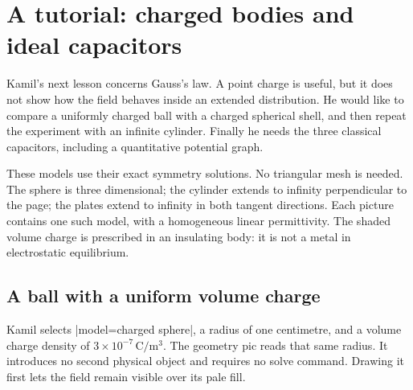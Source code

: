 \section{A tutorial: charged bodies and ideal capacitors}
\label{sec:tutorial-electric-classics}

Kamil's next lesson concerns Gauss's law. A point charge is useful, but it does
not show how the field behaves inside an extended distribution. He would like
to compare a uniformly charged ball with a charged spherical shell, and then
repeat the experiment with an infinite cylinder. Finally he needs the three
classical capacitors, including a quantitative potential graph.

These models use their exact symmetry solutions. No triangular mesh is needed.
The sphere is three dimensional; the cylinder extends to infinity perpendicular
to the page; the plates extend to infinity in both tangent directions. Each
picture contains one such model, with a homogeneous linear permittivity.
The shaded volume charge is prescribed in an insulating body: it is not a
metal in electrostatic equilibrium.

\subsection{A ball with a uniform volume charge}
Kamil selects |model=charged sphere|, a radius of one centimetre, and a volume
charge density of $3\times10^{-7}\,\mathrm{C/m^3}$. The geometry pic reads that
same radius. It introduces no second physical object and requires no solve
command. Drawing it first lets the field remain visible over its pale fill.

\begin{codeexample}[width=0pt]
\end{codeexample}


